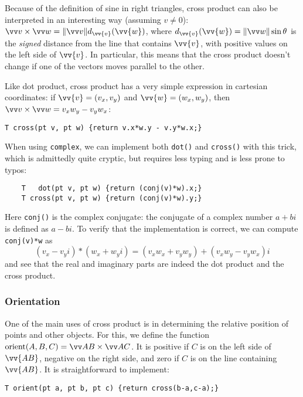 \begin{mathy}
Because of the definition of sine in right triangles, cross product can also be interpreted in an interesting way (assuming $v \neq 0$): $\crossv{v}{w} = \normv{v}d_{\vv{v}}(\vv{w})$, where $d_{\vv{v}}(\vv{w}) = \normv{w}\sin\theta$ is the \emph{signed} distance from the line that contains $\vv{v}$, with positive values on the left side of $\vv{v}$.
In particular, this means that the cross product doesn't change if one of the vectors moves parallel to the other.

\end{mathy}

Like dot product, cross product has a very simple expression in cartesian coordinates: if $\vv{v} = (v_x, v_y)$ and $\vv{w} = (w_x, w_y)$, then $\crossv{v}{w} = v_xw_y - v_yw_x$:
\begin{lstlisting}
T cross(pt v, pt w) {return v.x*w.y - v.y*w.x;}
\end{lstlisting}

\begin{trick}
    When using \lstinline|complex|, we can implement both \lstinline|dot()| and \lstinline|cross()| with this trick, which is admittedly quite cryptic, but requires less typing and is less prone to typos:
    \begin{lstlisting}
    T   dot(pt v, pt w) {return (conj(v)*w).x;}
    T cross(pt v, pt w) {return (conj(v)*w).y;}
    \end{lstlisting}

    Here \lstinline|conj()| is the complex conjugate: the conjugate of a complex number $a+bi$ is defined as $a-bi$. To verify that the implementation is correct, we can compute \lstinline|conj(v)*w| as
    \[(v_x-v_yi)\ast(w_x+w_yi) = (v_xw_x + v_yw_y) + (v_xw_y-v_yw_x)i\]
    and see that the real and imaginary parts are indeed the dot product and the cross product.
\end{trick}

\subsubsection{Orientation}
One of the main uses of cross product is in determining the relative position of points and other objects. For this, we define the function $\orient(A,B,C) = \crossv{AB}{AC}$. It is positive if $C$ is on the left side of $\vv{AB}$, negative on the right side, and zero if $C$ is on the line containing $\vv{AB}$. It is straightforward to implement:
\begin{lstlisting}
T orient(pt a, pt b, pt c) {return cross(b-a,c-a);}
\end{lstlisting}

